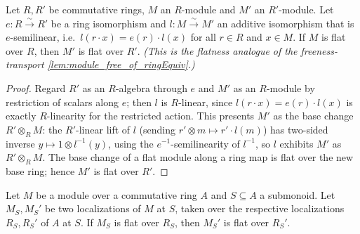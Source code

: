 \begin{lemma}

  \label{lem:flat_of_ringEquiv_semilinear}
  Let \(R, R'\) be commutative rings, \(M\) an \(R\)-module and \(M'\) an \(R'\)-module. Let
  \(e : R \xrightarrow{\sim} R'\) be a ring isomorphism and \(l : M \xrightarrow{\sim} M'\) an
  additive isomorphism that is \(e\)-semilinear, i.e.\ \(l(r \cdot x) = e(r) \cdot l(x)\) for all
  \(r \in R\) and \(x \in M\). If \(M\) is flat over \(R\), then \(M'\) is flat over \(R'\). \emph{(This
  is the flatness analogue of the freeness-transport \cref{lem:module_free_of_ringEquiv}.)}
\end{lemma}

\begin{proof}
  \leanok
  Regard \(R'\) as an \(R\)-algebra through \(e\) and \(M'\) as an \(R\)-module by restriction of
  scalars along \(e\); then \(l\) is \(R\)-linear, since \(l(r \cdot x) = e(r) \cdot l(x)\) is exactly
  \(R\)-linearity for the restricted action. This presents \(M'\) as the base change
  \(R' \otimes_R M\): the \(R'\)-linear lift of \(l\) (sending \(r' \otimes m \mapsto r' \cdot l(m)\))
  has two-sided inverse \(y \mapsto 1 \otimes l^{-1}(y)\), using the \(e^{-1}\)-semilinearity of
  \(l^{-1}\), so \(l\) exhibits \(M'\) as \(R' \otimes_R M\). The base change of a flat module along a
  ring map is flat over the new base ring; hence \(M'\) is flat over \(R'\).
\end{proof}

\begin{lemma}

  \label{lem:flat_localization_models}
  Let \(M\) be a module over a commutative ring \(A\) and \(S \subseteq A\) a submonoid. Let
  \(M_S, M_S'\) be two localizations of \(M\) at \(S\), taken over the respective localizations
  \(R_S, R_S'\) of \(A\) at \(S\). If \(M_S\) is flat over \(R_S\), then \(M_S'\) is flat over
  \(R_S'\).
\end{lemma}

